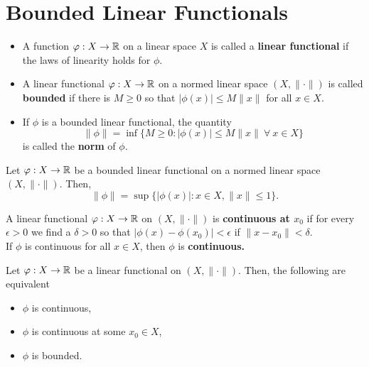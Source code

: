 \section{Bounded Linear Functionals}

\begin{definition}[Functionals]
	\begin{itemize}
		\item A function \( \varphi: X \to \mathbb{R}\) on a linear space \(X\) is called a \textbf{linear functional} if the laws of linearity holds for \(\phi\).
		\item A linear functional \(\varphi: X \to \mathbb{R}\) on a normed linear space \(\left( X, \|\cdot\| \right) \) is called \textbf{bounded} if there is \(M \ge 0\) so that \(\left| \phi\left( x \right)  \right| \le M \|x\|\) for all \(x \in X\).
		\item If \(\phi\) is a bounded linear functional, the quantity \[
		\|\phi\| = \inf \{ M \ge 0 : \left| \phi\left( x \right)  \right| \le M \|x\| \ \forall \ x \in X \}
		\] is called the \textbf{norm} of \(\phi\).
	\end{itemize}
\end{definition}
\begin{proposition}
	Let \(\varphi: X \to \mathbb{R}\) be a bounded linear functional on a normed linear space \(\left( X, \|\cdot\| \right) \). Then, \[
	\|\phi\| = \sup \{ \left| \phi\left( x \right)  \right|  : x \in X, \|x\|\le 1  \}
	.\]
\end{proposition}
\begin{definition}[Continuity]
	A linear functional \(\varphi: X \to \mathbb{R} \) on \(\left( X, \|\cdot\| \right) \) is \textbf{continuous at \(x_0\) } if for every \(\epsilon > 0\) we find a \(\delta > 0\) so that \(\left| \phi\left( x \right) - \phi\left( x_0 \right)  \right| < \epsilon\) if \(\|x - x_0\| < \delta\). \\If \(\phi\) is continuous for all \(x \in X\), then \(\phi\) is \textbf{continuous.}
\end{definition}
\begin{proposition}
Let \(\varphi: X \to \mathbb{R}\) be a linear functional on \(\left( X, \|\cdot\| \right) \). Then, the following are equivalent
\begin{itemize}
	\item \(\phi\) is continuous,
	\item \(\phi\) is continuous at some \(x_0 \in X\),
	\item \(\phi\) is bounded.
\end{itemize}
\end{proposition}
